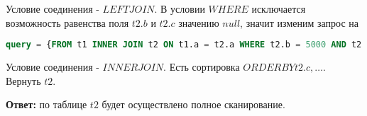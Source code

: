 Условие соединения - $LEFT JOIN$. В условии $WHERE$ исключается возможность равенства поля $t2.b$ и $t2.c$ значению $null$, значит изменим запрос на
\begin{lstlisting}[language=SQL]
query = {FROM t1 INNER JOIN t2 ON t1.a = t2.a WHERE t2.b = 5000 AND t2.c > 3 ORDER BY t2.c, t2.d}
\end{lstlisting}

Условие соединения - $INNER JOIN$. Есть сортировка $ORDER BY t2.c, \ldots$. Вернуть $t2$.

\textbf{Ответ:} по таблице $t2$ будет осуществлено полное сканирование. 